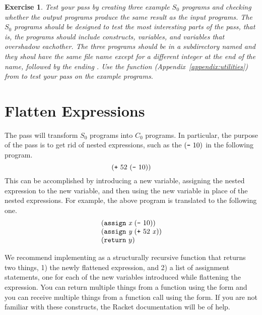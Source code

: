 \documentclass[12pt]{book}
\newtheorem{exercise}[theorem]{Exercise}
\begin{document}
\begin{exercise}
\normalfont %
Test your  pass by creating three example $S_0$ programs
and checking whether the output programs produce the same result as
the input programs. The $S_0$ programs should be designed to test the
most interesting parts of the  pass, that is, the
programs should include  constructs, variables, and variables
that overshadow eachother.  The three programs should be in a
subdirectory named  and they shoul have the same file name
except for a different integer at the end of the name, followed by the
ending .  Use the  function
(Appendix~\ref{appendix:utilities}) from  to test
your  pass on the example programs.

\end{exercise}


\section{Flatten Expressions}
\label{sec:flatten-s0}

The  pass will transform $S_0$ programs into $C_0$
programs. In particular, the purpose of the  pass is to
get rid of nested expressions, such as the $(\texttt{-}~10)$ in the
following program.
\[
(\texttt{+}~52~ (\texttt{-}~10) )
\]
This can be accomplished by introducing a new variable, assigning the
nested expression to the new variable, and then using the new variable
in place of the nested expressions. For example, the above program is
translated to the following one.
\[
\begin{array}{l}
(\texttt{assign}~ \mathit{x} \; (\texttt{-}~10) ) \\
(\texttt{assign}~ \mathit{y} \; (\texttt{+}~52~ \mathit{x} ) ) \\
(\texttt{return}~ y )
\end{array}
\]

We recommend implementing  as a structurally recursive
function that returns two things, 1) the newly flattened expression,
and 2) a list of assignment statements, one for each of the new
variables introduced while flattening the expression. You can return
multiple things from a function using the  form and you
can receive multiple things from a function call using the
 form. If you are not familiar with these
constructs, the Racket documentation will be of help.
\end{document}
